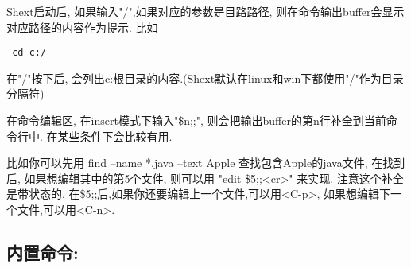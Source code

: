 \documentclass[oneside,openany]{book}
\begin{document}
  Shext启动后, 如果输入"/",如果对应的参数是目路路径, 则在命令输出buffer会显示
对应路径的内容作为提示. 比如 
  \begin{verbatim} cd c:/ \end{verbatim}
 在"/"按下后, 会列出c:根目录的内容.(Shext默认在linux和win下都使用"/"作为目录分隔符)

  在命令编辑区, 在insert模式下输入"\$n;;", 则会把输出buffer的第n行补全到当前命令行中.
在某些条件下会比较有用.

  比如你可以先用 find --name *.java --text Apple 查找包含Apple的java文件, 在找到后,
如果想编辑其中的第5个文件, 则可以用 "edit \$5;;<cr>" 来实现. 注意这个补全是带状态的,
在\$5;;后,如果你还要编辑上一个文件,可以用<C-p>, 如果想编辑下一个文件,可以用<C-n>.

  \subsection{内置命令:}
\end{document}

